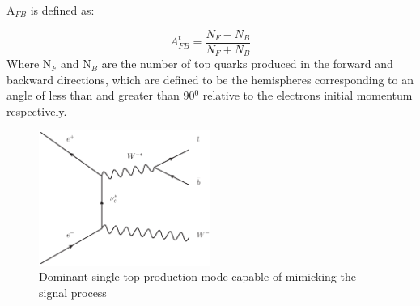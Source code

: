 A$_{FB}$ is defined as:

\begin{equation}
A_{FB}^t=\frac{N_F-N_B}{N_F+N_B}
\end{equation}
Where N$_{F}$ and N$_{B}$ are the number of top quarks produced in the forward and backward directions, which are defined to be the hemispheres corresponding to an angle of less than and greater than 90$^0$ relative to the electrons initial momentum respectively.

\begin{figure}[]
  \centering
  \includegraphics[width=0.5\textwidth]{TopAnalysis/figures/SingleTop}
  \caption[Dominant single top production mode]{Dominant single top production mode capable of mimicking the signal process}
  \label{fig:singletop}
\end{figure}


